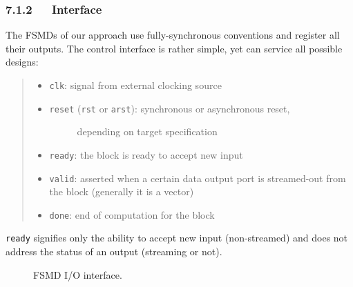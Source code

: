 \documentclass[a4paper]{article}
\begin{document}
\subsubsection{7.1.2~~~Interface%
  \label{interface}%
}

The FSMDs of our approach use fully-synchronous conventions and register all
their outputs. The control interface is rather simple, yet can service all
possible designs:
%
\begin{quote}
%
\begin{itemize}

\item \texttt{clk}: signal from external clocking source

\item %
\begin{description}
\item[{\texttt{reset} (\texttt{rst} or \texttt{arst}): synchronous or asynchronous reset,}] \leavevmode 
depending on target specification

\end{description}

\item \texttt{ready}: the block is ready to accept new input

\item \texttt{valid}: asserted when a certain data output port is streamed-out from the
block (generally it is a vector)

\item \texttt{done}: end of computation for the block

\end{itemize}

\end{quote}

\texttt{ready} signifies only the ability to accept new input (non-streamed) and does
not address the status of an output (streaming or not).
\begin{figure}
\noindent{}
\caption{FSMD I/O interface.}
\end{figure}
\end{document}

